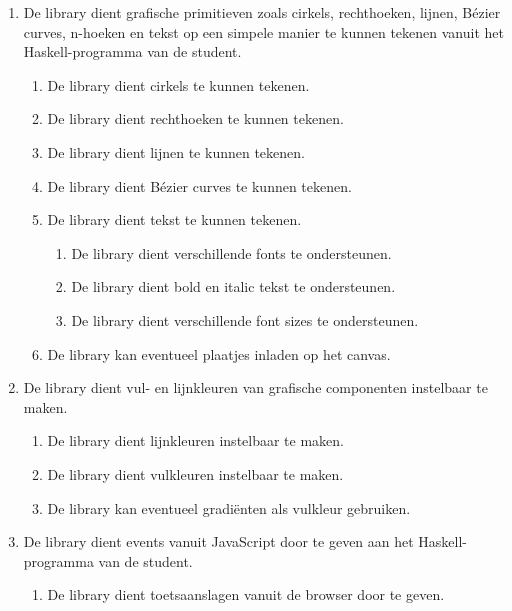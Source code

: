 \begin{enumerate}[label={R\arabic*}]
	\item \label{req:prim} De library dient grafische primitieven zoals cirkels, rechthoeken, lijnen, Bézier curves, n-hoeken en tekst op een simpele manier te kunnen tekenen vanuit het Haskell-programma van de student.
	\begin{enumerate}[label={R\arabic{enumi}.\arabic*}]
		\item \label{req:circle} De library dient cirkels te kunnen tekenen.
		\item \label{req:rect} De library dient rechthoeken te kunnen tekenen.
		\item \label{req:lines} De library dient lijnen te kunnen tekenen.
		\item \label{req:bezier} De library dient Bézier curves te kunnen tekenen.
		\item \label{req:text} De library dient tekst te kunnen tekenen.
		\begin{enumerate}[label={R\arabic{enumi}.\arabic{enumii}.\arabic*}]
			\item De library dient verschillende fonts te ondersteunen.
			\item De library dient bold en italic tekst te ondersteunen.
			\item De library dient verschillende font sizes te ondersteunen.
		\end{enumerate}
		\item \label{req:pictures} De library kan eventueel plaatjes inladen op het canvas.
	\end{enumerate}
	\item De library dient vul- en lijnkleuren van grafische componenten instelbaar te maken.
	\begin{enumerate}[label={R\arabic{enumi}.\arabic*}]
		\item \label{req:colors:lines} De library dient lijnkleuren instelbaar te maken.
		\item \label{req:colors:fill} De library dient vulkleuren instelbaar te maken.
		\item \label{req:colors:fill:gradient} De library kan eventueel gradiënten als vulkleur gebruiken.
	\end{enumerate}
	\item De library dient events vanuit JavaScript door te geven aan het Haskell-programma van de student.
	\begin{enumerate}[label={R\arabic{enumi}.\arabic*}]
		\item \label{req:event:key} De library dient toetsaanslagen vanuit de browser door te geven.

\end{enumerate}
\end{enumerate}
